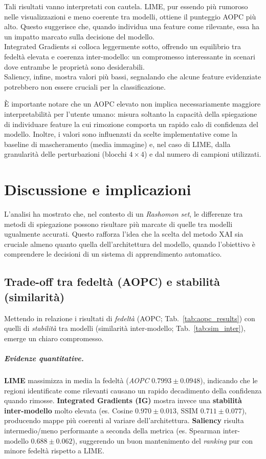 \documentclass[12pt,a4paper,oneside]{report}
\numberwithin{figure}{chapter}
\numberwithin{table}{chapter}
\begin{document}
\noindent
Tali risultati vanno interpretati con cautela. LIME, pur essendo più rumoroso nelle visualizzazioni e meno coerente tra modelli, ottiene il punteggio AOPC più alto. Questo suggerisce che, quando individua una feature come rilevante, essa ha un impatto marcato sulla decisione del modello. \\
Integrated Gradients si colloca leggermente sotto, offrendo un equilibrio tra fedeltà elevata e coerenza inter-modello: un compromesso interessante in scenari dove entrambe le proprietà sono desiderabili. \\
Saliency, infine, mostra valori più bassi, segnalando che alcune feature evidenziate potrebbero non essere cruciali per la classificazione.

È importante notare che un AOPC elevato non implica necessariamente maggiore interpretabilità per l’utente umano: misura soltanto la capacità della spiegazione di individuare feature la cui rimozione comporta un rapido calo di confidenza del modello. Inoltre, i valori sono influenzati da scelte implementative come la baseline di mascheramento (media immagine) e, nel caso di LIME, dalla granularità delle perturbazioni (blocchi $4\times4$) e dal numero di campioni utilizzati.

\chapter{Discussione e implicazioni}

L’analisi ha mostrato che, nel contesto di un \emph{Rashomon set}, le
differenze tra metodi di spiegazione possono risultare più marcate di quelle
tra modelli ugualmente accurati. Questo rafforza l’idea che la scelta del
metodo XAI sia cruciale almeno quanto quella dell’architettura del modello,
quando l’obiettivo è comprendere le decisioni di un sistema di apprendimento
automatico.

\section{Trade-off tra fedeltà (AOPC) e stabilità (similarità)}
\label{sec:disc-tradeoff}

Mettendo in relazione i risultati di \emph{fedeltà} (AOPC;
Tab.~\ref{tab:aopc_results}) con quelli di \emph{stabilità} tra modelli
(similarità inter-modello; Tab.~\ref{tab:sim_inter}), emerge un chiaro
compromesso.

\paragraph{Evidenze quantitative.}
\textbf{LIME} massimizza in media la fedeltà (\emph{AOPC} $0.7993 \pm 0.0948$), indicando che le
regioni identificate come rilevanti causano un rapido decadimento della confidenza quando rimosse.
\textbf{Integrated Gradients (IG)} mostra invece una \textbf{stabilità inter-modello} molto elevata
(es. Cosine $0.970 \pm 0.013$, SSIM $0.711 \pm 0.077$), producendo mappe più coerenti al variare
dell’architettura. \textbf{Saliency} risulta intermedio/meno performante a seconda della metrica
(es. Spearman inter-modello $0.688 \pm 0.062$), suggerendo un buon mantenimento del \emph{ranking}
pur con minore fedeltà rispetto a LIME.
\end{document}
